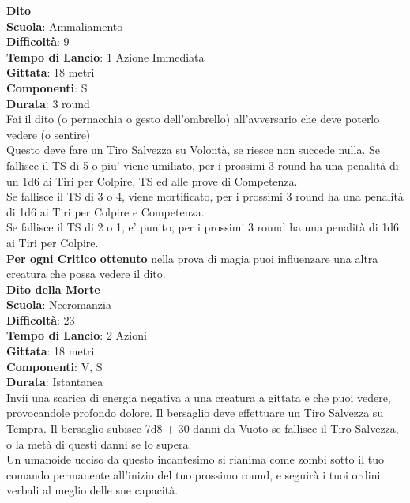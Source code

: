 \begin{multicols}{2}
\medskip\textbf{Dito}\\
\textbf{Scuola}: Ammaliamento\\
\textbf{Difficoltà}: 9\\
\textbf{Tempo di Lancio}: 1 Azione Immediata\\
\textbf{Gittata}: 18 metri\\
\textbf{Componenti}: S\\
\textbf{Durata}: 3 round\\
Fai il dito (o pernacchia o gesto dell'ombrello) all'avversario che deve poterlo vedere (o sentire)\\
Questo deve fare un Tiro Salvezza su Volontà, se riesce non succede nulla.
Se fallisce il TS di 5 o piu' viene umiliato, per i prossimi 3 round ha una penalità di un 1d6 ai Tiri per Colpire, TS ed alle prove di Competenza.\\
Se fallisce il TS di 3 o 4, viene mortificato, per i prossimi 3 round ha una penalità di 1d6 ai Tiri per Colpire e Competenza.\\
Se fallisce il TS di 2 o 1, e' punito, per i prossimi 3 round ha una penalità di 1d6 ai Tiri per Colpire.\\
\textbf{Per ogni Critico ottenuto} nella prova di magia puoi influenzare una altra creatura che possa vedere il dito.\\

\medskip\textbf{Dito della Morte}\\
\textbf{Scuola}: Necromanzia\\
\textbf{Difficoltà}: 23\\
\textbf{Tempo di Lancio}: 2 Azioni\\
\textbf{Gittata}: 18 metri\\
\textbf{Componenti}: V, S\\
\textbf{Durata}: Istantanea\\
Invii una scarica di energia negativa a una creatura a gittata e che puoi vedere, provocandole profondo dolore. Il bersaglio deve effettuare un Tiro Salvezza su Tempra. Il bersaglio subisce 7d8 + 30 danni da Vuoto se fallisce il Tiro Salvezza, o la metà di questi danni se lo supera.\\
Un umanoide ucciso da questo incantesimo si rianima come zombi sotto il tuo comando permanente all'inizio del tuo prossimo round, e seguirà i tuoi ordini verbali al meglio delle sue capacità.


\end{multicols}
